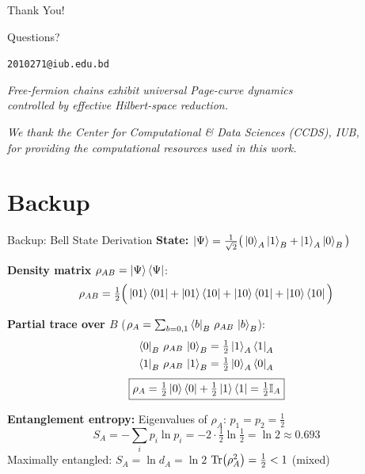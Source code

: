 \documentclass[aspectratio=169,11pt]{beamer}
\begin{document}
\begin{frame}
    \centering
    \Huge Thank You!
    
    \vspace{0.6cm}
    
    \Large Questions?
    
    \vspace{0.6cm}
    
    \normalsize
    \texttt{2010271@iub.edu.bd}
    
    \vspace{0.4cm}
    \small
    \textit{Free-fermion chains exhibit universal Page-curve dynamics\\controlled by effective Hilbert-space reduction.}
    
    \vspace{0.3cm}
    \footnotesize
    \textit{We thank the Center for Computational \& Data Sciences (CCDS), IUB,\\for providing the computational resources used in this work.}
\end{frame}

\appendix
\section*{Backup}

\begin{frame}{Backup: Bell State Derivation}
\small
    \textbf{State:} $\ket{\Psi} = \tfrac{1}{\sqrt{2}}\big(\ket{0}_A\ket{1}_B + \ket{1}_A\ket{0}_B\big)$

    \textbf{Density matrix} $\rho_{AB} = \ket{\Psi}\bra{\Psi}$:
    \[
        \rho_{AB} = \tfrac{1}{2}\Big(\ket{01}\bra{01} + \ket{01}\bra{10} + \ket{10}\bra{01} + \ket{10}\bra{10}\Big)
    \]

    \textbf{Partial trace over $B$} \quad ($\rho_A = \sum_{b=0,1} \bra{b}_B\,\rho_{AB}\,\ket{b}_B$):
    \begin{align*}
        \bra{0}_B\,\rho_{AB}\,\ket{0}_B &= \tfrac{1}{2}\ket{1}_A\bra{1}_A \\
        \bra{1}_B\,\rho_{AB}\,\ket{1}_B &= \tfrac{1}{2}\ket{0}_A\bra{0}_A
    \end{align*}
    \[
        \boxed{\rho_A = \tfrac{1}{2}\ket{0}\bra{0} + \tfrac{1}{2}\ket{1}\bra{1} = \tfrac{1}{2}\mathbb{I}_A}
    \]

    \textbf{Entanglement entropy:}
    Eigenvalues of $\rho_A$: $p_1 = p_2 = \tfrac{1}{2}$
    \[
        S_A = -\sum_i p_i \ln p_i = -2 \cdot \tfrac{1}{2}\ln\tfrac{1}{2} = \ln 2 \approx 0.693
    \]
    Maximally entangled: $S_A = \ln d_A = \ln 2$ \checkmark \quad $\Tr(\rho_A^2) = \tfrac{1}{2} < 1$ (mixed) \checkmark
\end{frame}
\end{document}
